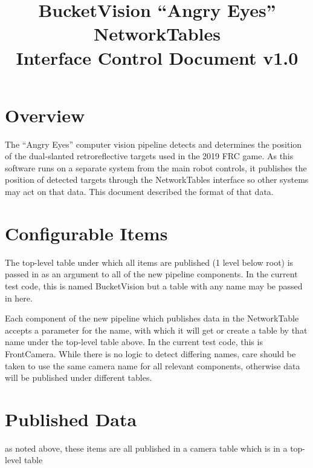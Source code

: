 \documentclass[14pt,letterpaper]{report}
\title{BucketVision “Angry Eyes” NetworkTables \protect\\ Interface Control Document v1.0}
\begin{document}
	\begin{center}
		{\LARGE \@title}
		
		{\textit \@date}
	\end{center}

	\section*{Overview}
		
	The “Angry Eyes” computer vision pipeline detects and determines the position of the dual-slanted retroreflective targets used in the 2019 FRC game. As this software runs on a separate system from the main robot controls, it publishes the position of detected targets through the NetworkTables interface so other systems may act on that data. This document described the format of that data.
		
	\section*{Configurable Items}
	
	The top-level table under which all items are published (1 level below root) is passed in as an argument to all of the new pipeline components. In the current test code, this is named BucketVision but a table with any name may be passed in here.
	
	\noindent Each component of the new pipeline which publishes data in the NetworkTable accepts a parameter for the name, with which it will get or create a table by that name under the top-level table above. In the current test code, this is FrontCamera. While there is no logic to detect differing names, care should be taken to use the same camera name for all relevant components, otherwise data will be published under different tables.
	
	
	\section*{Published Data}
	
	as noted above, these items are all published in a camera table which is in a top-level table
	
\end{document}
